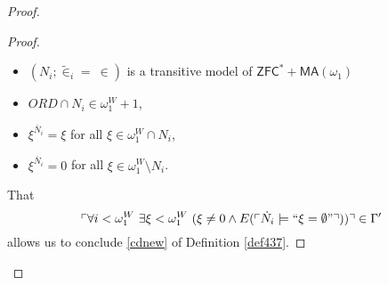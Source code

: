 \documentclass[12pt]{article}
\numberwithin{equation}{section}
\begin{document}
\begin{proof}
\begin{proof}
\begin{itemize}
    \item $(N_i; \tilde{\in}_i = \ \in)$ is a transitive model of $\mathsf{ZFC}^* + \mathsf{MA}(\omega_1)$ 
    \item $ORD \cap N_i \in \omega_1^W + 1$,
    \item $\xi^{\bar{N}_i} = \xi$ for all $\xi \in \omega_1^W \cap N_i$,
    \item $\xi^{\bar{N}_i} = 0$ for all $\xi \in \omega_1^W \setminus N_i$.
\end{itemize}
That 
\begin{equation*}
\ulcorner \forall i < \omega_1^W \ \exists \xi < \omega_1^W \ (\xi \neq 0 \wedge E(\ulcorner \dot{N}_i \models ``\xi = \emptyset" \urcorner)) \urcorner \in \Gamma'
\end{equation*}
allows us to conclude \ref{cdnew} of Definition \ref{def437}.


\end{proof}
\end{proof}
\end{document}
